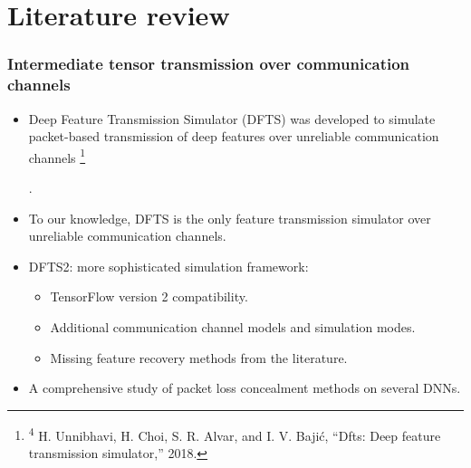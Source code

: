 \documentclass[aspectratio=169]{beamer}
\newcommand\blfootnote[1]{%
	\begingroup
	\renewcommand\thefootnote{}\footnote{#1}%
	\addtocounter{footnote}{-1}%
	\endgroup
}
\begin{document}

\section{Literature review}

\begin{frame}
\frametitle{Intermediate tensor transmission over communication channels}
	\begin{itemize}
	\item Deep Feature Transmission Simulator (DFTS) was developed to simulate packet-based transmission of deep features over unreliable communication channels \blfootnote{\tiny \textsuperscript{4} H. Unnibhavi, H. Choi, S. R. Alvar, and I. V. Bajić, “Dfts: Deep feature transmission simulator,” 2018.} \cite{unnibhavi2018dfts}.
	\item To our knowledge, DFTS is the only feature transmission simulator over unreliable communication channels.
	\item DFTS2: more sophisticated simulation framework:
	\begin{itemize}
	    \item TensorFlow version 2 compatibility.
	    \item Additional communication channel models and simulation modes.
	    \item Missing feature recovery methods from the literature.
	\end{itemize}
	\item A comprehensive study of packet loss concealment methods on several DNNs.
	\end{itemize}
\end{frame}
\end{document}
